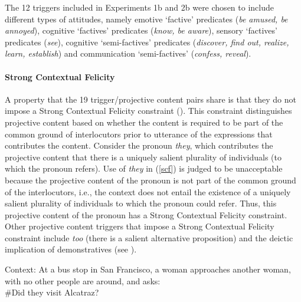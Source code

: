 \documentclass[11pt,fleqn]{article}
\newcommand{\6}{\mbox{$[\hspace*{-.6mm}[$}}
\newcommand{\9}{\mbox{$]\hspace*{-.6mm}]$}}
\begin{document}
The 12 triggers included in Experiments 1b and 2b were chosen to include different types of attitudes, namely emotive `factive' predicates ({\em be amused, be annoyed}), cognitive `factives' predicates ({\em know, be aware}), sensory `factives' predicates ({\em see}), cognitive `semi-factives' predicates ({\em discover, find out, realize, learn, establish}) and communication `semi-factives' ({\em confess, reveal}).

\paragraph{Strong Contextual Felicity} A property that the 19 trigger/projective content pairs share is that they do not impose a Strong Contextual Felicity constraint (\citealt{brst-lang11}). This constraint distinguishes projective content based on whether the content is required to be part of the common ground of interlocutors prior to utterance of the expressions that contributes the content. Consider the pronoun {\em they}, which contributes the projective content that there is a uniquely salient plurality of individuals (to which the pronoun refers). Use of {\em they} in (\ref{scf}) is judged to be unacceptable because the projective content of the pronoun is not part of the common ground of the interlocutors, i.e., the context does not entail the existence of a uniquely salient plurality of individuals to which the pronoun could refer. Thus, this projective content of the pronoun has a Strong Contextual Felicity constraint. Other projective content triggers that impose a Strong Contextual Felicity constraint include {\em too} (there is a salient alternative proposition) and the deictic implication of demonstratives (see \citealt{brst-lang11}).

\begin{exe}
\ex\label{scf} Context: At a bus stop in San Francisco, a woman approaches another woman, with no other people are around, and asks: \\ \#Did they visit Alcatraz?
\end{exe}
\end{document}
